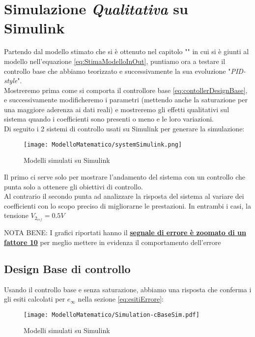 \section{Simulazione \textit{Qualitativa} su Simulink}
Partendo dal modello stimato che si è ottenuto nel capitolo "" in cui si è giunti al modello nell'equazione \ref{eq:StimaModelloInOut}, puntiamo ora a testare il controllo base che abbiamo teorizzato e successivamente la sua evoluzione "\textit{PID-style}".\\
Mostreremo prima come si comporta il controllore base \ref{eq:contollerDesignBase}, e successivamente modificheremo i parametri (mettendo anche la saturazione per una maggiore aderenza ai dati reali) e mostreremo gli effetti qualitativi sul sistema quando i coefficienti sono presenti o meno e le loro variazioni.\\
Di seguito i 2 sistemi di controllo usati su Simulink per generare la simulazione:
\begin{figure}[H]
	\centering
	\caption[Modelli simulati su Simulink]{Modelli simulati su Simulink}
	\texttt{[image: ModelloMatematico/systemSimulink.png]}
\end{figure}

\noindent
Il primo ci serve solo per mostrare l'andamento del sistema con un controllo che punta solo a ottenere gli obiettivi di controllo.\\
Al contrario il secondo punta ad analizzare la risposta del sistema al variare dei coefficienti con lo scopo preciso di migliorarne le prestazioni.
In entrambi i casi, la tensione $ V_{2_{ref}} = 0.5V$ 

\noindent
{\footnotesize NOTA BENE: I grafici riportati hanno il \textbf{\underline{segnale di errore è zoomato di un fattore 10}} per meglio mettere in evidenza il comportamento dell'errore}

\newpage

\subsection{Design Base di controllo}
Usando il controllo base e senza saturazione, abbiamo una risposta che conferma i gli esiti calcolati per $ e_\infty $ nella sezione \ref{eq:esitiErrore}:
\begin{figure}[H]
	\centering
	\caption[Modelli simulati su Simulink]{Modelli simulati su Simulink}
	\texttt{[image: ModelloMatematico/Simulation-cBaseSim.pdf]}
\end{figure}

